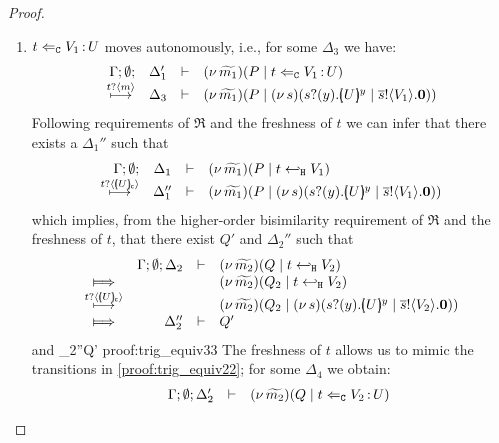 \begin{proof}
\begin{enumerate}[1.]
\begin{enumerate}
					\item	$t \Leftarrow_{\mathtt{C}} V_1{\,:\,}U$ moves autonomously, i.e., for some $\Delta_3$ we have:
						\[
							\begin{array}{rcll} \Gamma; \emptyset; &\Delta_1'& \vdash& (\nu\, \widetilde{m_1})(P \;|\; t \Leftarrow_{\mathtt{C}} V_1{\,:\,}U)\\ \stackrel{t ? \langle m \rangle}{\longmapsto} &\Delta_3& \vdash &  (\nu\, \widetilde{m_1})(P \;|\; (\nu\, s)(s ? (y) . [\!\!(U)\!\!]^{y} \;|\; \overline{s} ! \langle V_1 \rangle . \mathbf{0})) \end{array}
						\]
							Following requirements of $\Re$ and the freshness of $t$
							we can infer that there exists a $\Delta_1''$ such that
						\[
							\mhorel{\Gamma}{\Delta_1}{\newsp{\widetilde{m_1}}{P \Par \htrigger{t}{V_1}}}
							{\hby{\bactinp{t}{\omapchar{U}}}}
							{\Delta_1''}{}{\newsp{\widetilde{m_1}}{P \Par \newsp{s}{\binp{s}{y} \mapchar{U}{y} \Par \bout{\dual{s}}{V_1} \inact}}}
						\]
							which implies, from the higher-order bisimilarity requirement of $\Re$ and
							the freshness of $t$, that there exist $Q'$ and $\Delta_2''$ such that
							\begin{eqnarray}
								\begin{array}{crll}
									& \Gamma; \es; \Delta_2 & \proves &		
									\newsp{\widetilde{m_2}}{Q \Par \htrigger{t}{V_2}}
									\\
									\Hby{} &&&
									\newsp{\widetilde{m_2}}{Q_2 \Par \htrigger{t}{V_2}}
									\\
									{\hby{\bactinp{t}{\omapchar{U}}}} & & &
									\newsp{\widetilde{m_2}}{Q_2 \Par \newsp{s}{\binp{s}{y} \mapchar{U}{y} \Par \bout{\dual{s}}{V_2} \inact}}
									\\
									\Hby{} & \Delta_2'' & \proves & Q'
								\end{array}
								\label{proof:trig_equiv22}
							\end{eqnarray}
							and
							{\hwb}
							{\Delta_2''}{Q'}
							{proof:trig_equiv33}
							The freshness of $t$ allows us to mimic the transitions
							in \eqref{proof:trig_equiv22}; for some $\Delta_4$ we obtain:
							\begin{eqnarray*}
								\begin{array}{crll}
									& \Gamma; \emptyset; \Delta_2' & \vdash &		
									(\nu\, \widetilde{m_2})(Q \;|\; t \Leftarrow_{\mathtt{C}} V_2{\,:\,}U)
									\\

\end{array}
\end{eqnarray*}
\end{enumerate}
\end{enumerate}
\end{proof}
